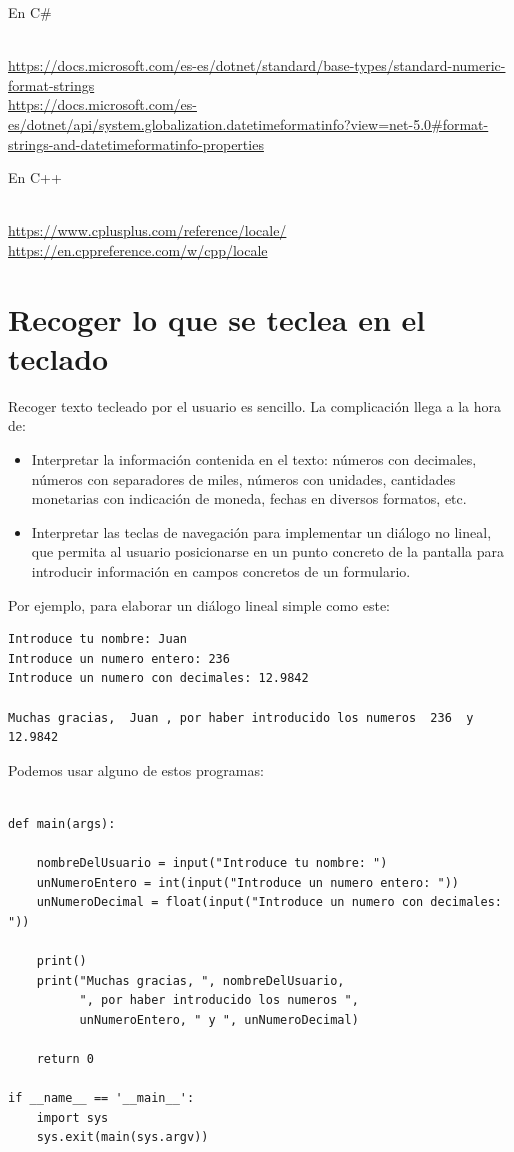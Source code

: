 \documentclass[spanish,12pt,a4paper,final,oneside]{book}
\begin{document}
En C\#
\begin{scriptsize}
\\ \url{https://docs.microsoft.com/es-es/dotnet/standard/base-types/standard-numeric-format-strings}
\\ \url{https://docs.microsoft.com/es-es/dotnet/api/system.globalization.datetimeformatinfo?view=net-5.0#format-strings-and-datetimeformatinfo-properties}
\end{scriptsize}

En C++
\begin{footnotesize}
\\ \url{https://www.cplusplus.com/reference/locale/}
\\ \url{https://en.cppreference.com/w/cpp/locale}
\end{footnotesize}

\section{Recoger lo que se teclea en el teclado}
Recoger texto tecleado por el usuario es sencillo. La complicación llega a la hora de:
\begin{itemize}
\item Interpretar la información contenida en el texto: números con decimales, números con separadores de miles, números con unidades, cantidades monetarias con indicación de moneda, fechas en diversos formatos, etc.
\item Interpretar las teclas de navegación para implementar un diálogo no lineal, que permita al usuario posicionarse en un punto concreto de la pantalla para introducir información en campos concretos de un formulario.
\end{itemize}
 
Por ejemplo, para elaborar un diálogo lineal simple como este:
\begin{lstlisting}
Introduce tu nombre: Juan
Introduce un numero entero: 236
Introduce un numero con decimales: 12.9842

Muchas gracias,  Juan , por haber introducido los numeros  236  y  12.9842
\end{lstlisting}

Podemos usar alguno de estos programas:

\begin{lstlisting}[frame=single, caption=lenguaje phyton]

def main(args):
    
    nombreDelUsuario = input("Introduce tu nombre: ")
    unNumeroEntero = int(input("Introduce un numero entero: "))
    unNumeroDecimal = float(input("Introduce un numero con decimales: "))
    
    print()
    print("Muchas gracias, ", nombreDelUsuario, 
          ", por haber introducido los numeros ",
          unNumeroEntero, " y ", unNumeroDecimal)
    
    return 0

if __name__ == '__main__':
    import sys
    sys.exit(main(sys.argv))
\end{lstlisting}
\end{document}
